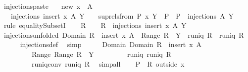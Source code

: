 \begin{isabellebody}
\begin{isamarkuptext}
\end{isamarkuptext}%
\isamarkuptrue%
\isamarkupfalse%
\ injections{\isacharunderscore}paste{\isacharcolon}\isanewline
\ \ \ new{\isacharcolon}\ {\isachardoublequoteopen}x\ {\isasymnotin}\ A{\isachardoublequoteclose}\isanewline
\ \ \ {\isachardoublequoteopen}injections\ {\isacharparenleft}insert\ x\ A{\isacharparenright}\ Y\ {\isacharequal}\ {\isacharparenleft}{\isasymUnion}\ {\isacharbraceleft}\ sup{\isacharunderscore}rels{\isacharunderscore}from\ P\ x\ Y\ {\isacharbar}\ P\ {\isachardot}\ P\ {\isasymin}\ injections\ A\ Y\ {\isacharbraceright}{\isacharparenright}{\isachardoublequoteclose}\isanewline
%
\isadelimproof
%
\endisadelimproof
%
\isatagproof
{}\isamarkupfalse%
\ {\isacharparenleft}rule\ equalitySubsetI{\isacharparenright}\isanewline
\ \ \isamarkupfalse%
\ R\isanewline
\ \ \isamarkupfalse%
\ {\isachardoublequoteopen}R\ {\isasymin}\ injections\ {\isacharparenleft}insert\ x\ A{\isacharparenright}\ Y{\isachardoublequoteclose}\isanewline
\ \ \isamarkupfalse%
\ \isamarkupfalse%
\ injections{\isacharunderscore}unfolded{\isacharcolon}\ {\isachardoublequoteopen}Domain\ R\ {\isacharequal}\ insert\ x\ A\ {\isasymand}\ Range\ R\ {\isasymsubseteq}\ Y\ {\isasymand}\ runiq\ R\ {\isasymand}\ runiq\ {\isacharparenleft}R{\isasyminverse}{\isacharparenright}{\isachardoublequoteclose}\isanewline
\ \ \ \ \isamarkupfalse%
\ injections{\isacharunderscore}def\ \isamarkupfalse%
\ simp\isanewline
\ \ \isamarkupfalse%
\ \isamarkupfalse%
\ Domain{\isacharcolon}\ {\isachardoublequoteopen}Domain\ R\ {\isacharequal}\ insert\ x\ A{\isachardoublequoteclose}\isanewline
\ \ \ \ \ \ \ \ \ Range{\isacharcolon}\ {\isachardoublequoteopen}Range\ R\ {\isasymsubseteq}\ Y{\isachardoublequoteclose}\isanewline
\ \ \ \ \ \ \ \ \ runiq{\isacharcolon}\ {\isachardoublequoteopen}runiq\ R{\isachardoublequoteclose}\isanewline
\ \ \ \ \ \ \ \ \ runiq{\isacharunderscore}conv{\isacharcolon}\ {\isachardoublequoteopen}runiq\ {\isacharparenleft}R{\isasyminverse}{\isacharparenright}{\isachardoublequoteclose}\ \isamarkupfalse%
\ simp{\isacharunderscore}all\isanewline
\isanewline
\ \ \isamarkupfalse%
\ {\isacharquery}P\ {\isacharequal}\ {\isachardoublequoteopen}R\ outside\ {\isacharbraceleft}x{\isacharbraceright}{\isachardoublequoteclose}\isanewline
\ \ \isamarkupfalse%

\end{isabellebody}
